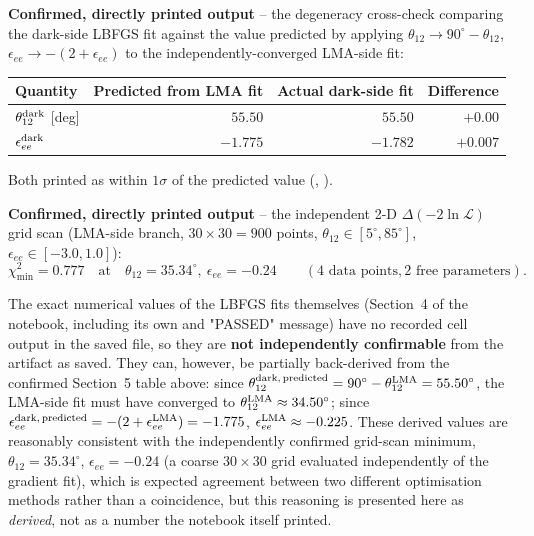 \begin{resultbox}
\textbf{Confirmed, directly printed output} -- the degeneracy cross-check
comparing the dark-side LBFGS fit against the value predicted by applying
$\theta_{12}\to90^\circ-\theta_{12}$,
$\epsilon_{ee}\to-(2+\epsilon_{ee})$ to the independently-converged
LMA-side fit:
\begin{center}
\small
\begin{tabular}{@{}lrrr@{}}
\toprule
Quantity & Predicted from LMA fit & Actual dark-side fit & Difference \\
\midrule
$\theta_{12}^{\rm dark}$ [deg] & $55.50$ & $55.50$ & $+0.00$ \\
$\epsilon_{ee}^{\rm dark}$ & $-1.775$ & $-1.782$ & $+0.007$ \\
\bottomrule
\end{tabular}
\end{center}
Both printed as within $1\sigma$ of the predicted value
(,
).

\textbf{Confirmed, directly printed output} -- the independent 2-D
$\Delta(-2\ln\mathcal L)$ grid scan (LMA-side branch,
$30\times30=900$ points, $\theta_{12}\in[5^\circ,85^\circ]$,
$\epsilon_{ee}\in[-3.0,1.0]$):
\begin{equation*}
  \chi^2_{\min} = 0.777 \quad\text{at}\quad \theta_{12}=35.34^\circ,\ \epsilon_{ee}=-0.24
  \qquad(4\text{ data points}, 2\text{ free parameters}).
\end{equation*}
\end{resultbox}

\begin{notebox}
The exact numerical values of the LBFGS fits themselves (Section~4 of the
notebook, including its own  and "PASSED"
message) have no recorded cell output in the saved file, so they are
\textbf{not independently confirmable} from the artifact as saved. They can,
however, be partially back-derived from the confirmed Section~5 table above:
since $\theta_{12}^{\rm dark,\,predicted}=90^\circ-\theta_{12}^{\rm LMA}=55.50^\circ$,
the LMA-side fit must have converged to $\theta_{12}^{\rm LMA}\approx34.50^\circ$;
since $\epsilon_{ee}^{\rm dark,\,predicted}=-(2+\epsilon_{ee}^{\rm LMA})=-1.775$,
$\epsilon_{ee}^{\rm LMA}\approx-0.225$. These derived values are reasonably
consistent with the independently confirmed grid-scan minimum,
$\theta_{12}=35.34^\circ$, $\epsilon_{ee}=-0.24$ (a coarse $30\times30$ grid
evaluated independently of the gradient fit), which is expected agreement
between two different optimisation methods rather than a coincidence, but
this reasoning is presented here as \emph{derived}, not as a number the
notebook itself printed.
\end{notebox}

